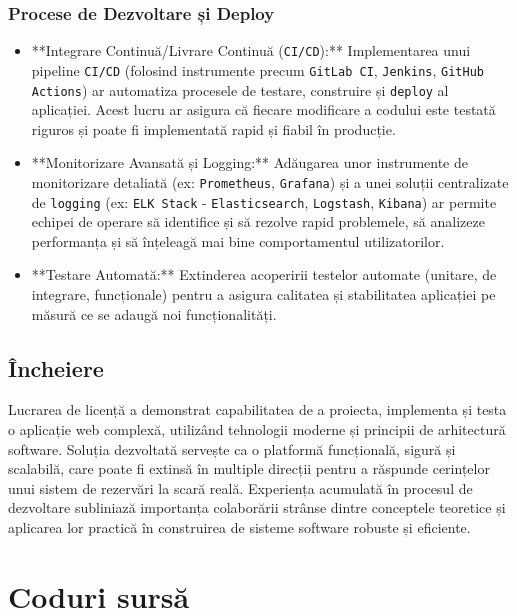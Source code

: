 \documentclass[12pt, a4paper, oneside, romanian]{teza-upb}
\begin{document}
\subsection{Procese de Dezvoltare și Deploy}
\begin{itemize}
	\item **Integrare Continuă/Livrare Continuă (\texttt{CI/CD}):** Implementarea unui pipeline \texttt{CI/CD} (folosind instrumente precum \texttt{GitLab CI}, \texttt{Jenkins}, \texttt{GitHub Actions}) ar automatiza procesele de testare, construire și \texttt{deploy} al aplicației. Acest lucru ar asigura că fiecare modificare a codului este testată riguros și poate fi implementată rapid și fiabil în producție.
	\item **Monitorizare Avansată și Logging:** Adăugarea unor instrumente de monitorizare detaliată (ex: \texttt{Prometheus}, \texttt{Grafana}) și a unei soluții centralizate de \texttt{logging} (ex: \texttt{ELK Stack} - \texttt{Elasticsearch}, \texttt{Logstash}, \texttt{Kibana}) ar permite echipei de operare să identifice și să rezolve rapid problemele, să analizeze performanța și să înțeleagă mai bine comportamentul utilizatorilor.
	\item **Testare Automată:** Extinderea acoperirii testelor automate (unitare, de integrare, funcționale) pentru a asigura calitatea și stabilitatea aplicației pe măsură ce se adaugă noi funcționalități.
\end{itemize}



\section{Încheiere}
Lucrarea de licență a demonstrat capabilitatea de a proiecta, implementa și testa o aplicație web complexă, utilizând tehnologii moderne și principii de arhitectură software. Soluția dezvoltată servește ca o platformă funcțională, sigură și scalabilă, care poate fi extinsă în multiple direcții pentru a răspunde cerințelor unui sistem de rezervări la scară reală. Experiența acumulată în procesul de dezvoltare subliniază importanța colaborării strânse dintre conceptele teoretice și aplicarea lor practică în construirea de sisteme software robuste și eficiente.






\newpage
\appendix
\chapter{Coduri sursă}
\end{document}
